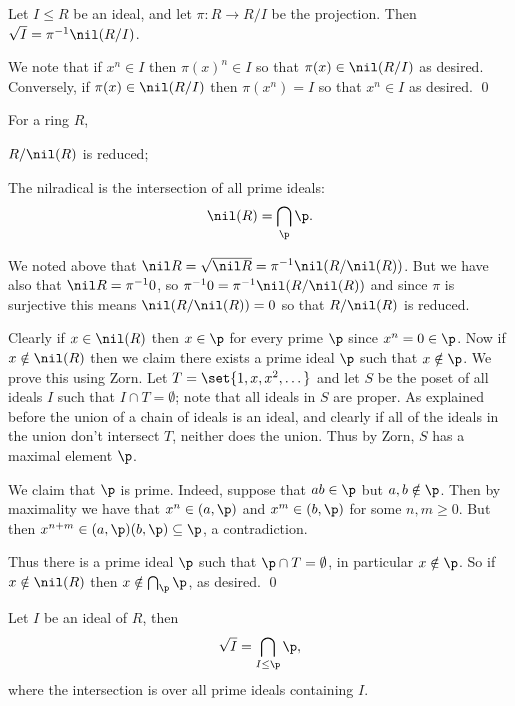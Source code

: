 \bprop

    Let $I\leq R$ be an ideal, and let $\pi\colon R\to R/I$ be the projection.
    Then $\sqrt I=\pi^{-1}\nil(R/I)$.

\eprop

\bproof

    We note that if $x^n\in I$ then $\pi(x)^n\in I$ so that $\pi(x)\in\nil(R/I)$ as desired.
    Conversely, if $\pi(x)\in\nil(R/I)$ then $\pi(x^n)=I$ so that $x^n\in I$ as desired.
    \qed

\eproof

\bprop

    For a ring $R$,
    \benum
        \item $R/\nil(R)$ is reduced;
        \item The nilradical is the intersection of all prime ideals:
        $$ \nil(R) = \bigcap_\p\p . $$
    \eenum

\eprop

\bproof

    We noted above that $\nil R=\sqrt{\nil R}=\pi^{-1}\nil(R/\nil(R))$.
    But we have also that $\nil R=\pi^{-1}0$, so $\pi^{-1}0=\pi^{-1}\nil(R/\nil(R))$ and since $\pi$ is surjective this means $\nil(R/\nil(R))=0$
    so that $R/\nil(R)$ is reduced.

    Clearly if $x\in\nil(R)$ then $x\in\p$ for every prime $\p$ since $x^n=0\in\p$.
    Now if $x\notin\nil(R)$ then we claim there exists a prime ideal $\p$ such that $x\notin\p$.
    We prove this using Zorn.
    Let $T=\set{1,x,x^2,\dots}$ and let $S$ be the poset of all ideals $I$ such that $I\cap T=\emptyset$; note that all ideals in $S$ are proper.
    As explained before the union of a chain of ideals is an ideal, and clearly if all of the ideals in the union don't intersect $T$, neither
    does the union.
    Thus by Zorn, $S$ has a maximal element $\p$.

    We claim that $\p$ is prime.
    Indeed, suppose that $ab\in\p$ but $a,b\notin\p$.
    Then by maximality we have that $x^n\in(a,\p)$ and $x^m\in(b,\p)$ for some $n,m\geq0$.
    But then $x^{n+m}\in(a,\p)(b,\p)\subseteq\p$, a contradiction.

    Thus there is a prime ideal $\p$ such that $\p\cap T=\emptyset$, in particular $x\notin\p$.
    So if $x\notin\nil(R)$ then $x\notin\bigcap_\p\p$, as desired.
    \qed

\eproof

\bcoro

    Let $I$ be an ideal of $R$, then
    $$ \sqrt I = \bigcap_{I\leq\p}\p , $$
    where the intersection is over all prime ideals containing $I$.

